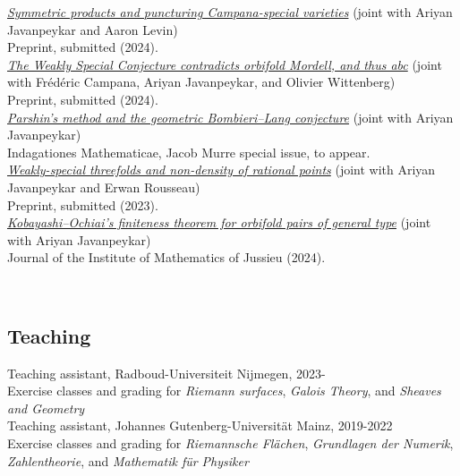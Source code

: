 \documentclass[paper=a4,fontsize=10pt,DIV=11,BCOR=3mm,pdftex]{scrartcl}
\begin{document}
\href{https://arxiv.org/abs/2412.14931}{\textit{Symmetric products and puncturing Campana-special varieties}} (joint with Ariyan Javanpeykar and Aaron Levin) \\
Preprint, submitted (2024). \\

\href{https://arxiv.org/abs/2410.06643}{\textit{The Weakly Special Conjecture contradicts orbifold Mordell, and thus abc}} (joint with Frédéric Campana, Ariyan Javanpeykar, and Olivier Wittenberg) \\
Preprint, submitted (2024). \\

\href{https://doi.org/10.1016/j.indag.2024.10.005}{\textit{Parshin's method and the geometric Bombieri--Lang conjecture}} (joint with Ariyan Javanpeykar) \\
Indagationes Mathematicae, Jacob Murre special issue, to appear. \\

\href{https://arxiv.org/abs/2310.09065}{\textit{Weakly-special threefolds and non-density of rational points}} (joint with Ariyan Javanpeykar and Erwan Rousseau) \\
Preprint, submitted (2023). \\

\href{https://doi.org/10.1017/S1474748024000094}{\textit{Kobayashi--Ochiai's finiteness theorem for orbifold pairs of general type}} (joint with Ariyan Javanpeykar) \\
Journal of the Institute of Mathematics of Jussieu (2024).

~\par


\subsection*{Teaching}
Teaching assistant, Radboud-Universiteit Nijmegen, 2023- \\
Exercise classes and grading for \textit{Riemann surfaces}, \textit{Galois Theory}, and \textit{Sheaves and Geometry} \\

Teaching assistant, Johannes Gutenberg-Universität Mainz, 2019-2022 \\
Exercise classes and grading for \textit{Riemannsche Flächen}, \textit{Grundlagen der Numerik}, \textit{Zahlentheorie}, and \textit{Mathematik für Physiker} \medskip \par


~\par
\end{document}
